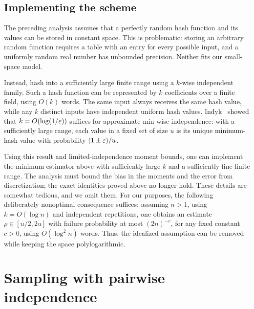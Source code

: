 \subsection{Implementing the scheme}
%

The preceding analysis assumes that a perfectly random hash function
and its values can be stored in constant space. This is problematic:
storing an arbitrary random function requires a table with an entry for
every possible input, and a uniformly random real number has unbounded
precision. Neither fits our small-space model.

Instead, hash into a sufficiently large finite range using a $k$-wise
independent family. Such a hash function can be represented by $k$
coefficients over a finite field, using $O(k)$ words. The same input
always receives the same hash value, while any $k$ distinct inputs have
independent uniform hash values. Indyk~\cite{i-samwi-01} showed that
$k=O(\log(1/{\varepsilon}))$ suffices for approximate min-wise independence:
with a sufficiently large range, each value in a fixed set of size $u$
is its unique minimum-hash value with probability $(1\pm{\varepsilon})/u$.

Using this result and limited-independence moment bounds, one can
implement the minimum estimator above with sufficiently large $k$ and
a sufficiently fine finite range. The analysis must bound the bias in
the moments and the error from discretization; the exact identities
proved above no longer hold. These details are somewhat tedious, and
we omit them. For our purposes, the following deliberately nonoptimal
consequence suffices: assuming $n>1$, using $k=O(\log n)$ and independent repetitions,
one obtains an estimate $\rho\in[u/2,2u]$ with failure probability at
most $(2n)^{-c}$, for any fixed constant $c>0$, using
$O(\log^2 n)$ words. Thus, the idealized assumption can be removed
while keeping the space polylogarithmic.


\newcommand{\distinctX}[1]{\mathrm{set}\pth{#1}}

\section{Sampling with pairwise independence}




